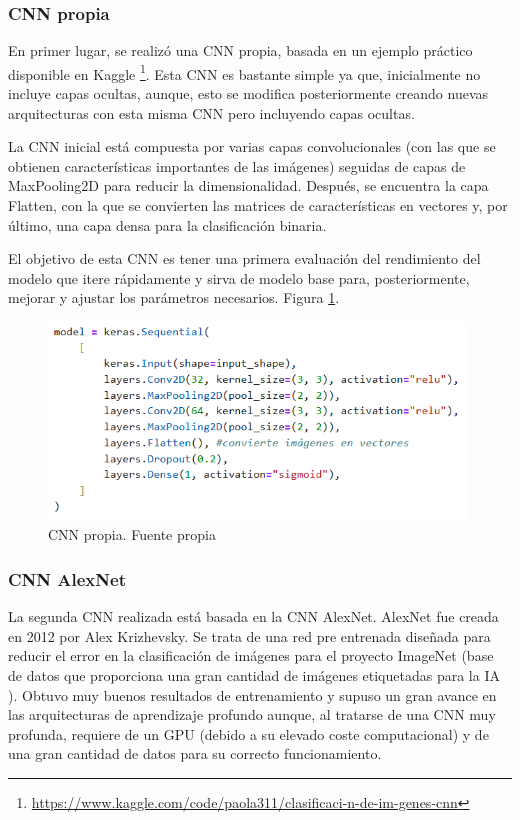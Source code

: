 \subsubsection{CNN propia}

En primer lugar, se realizó una CNN propia, basada en un ejemplo práctico disponible en Kaggle \footnote{\url{https://www.kaggle.com/code/paola311/clasificaci-n-de-im-genes-cnn}}. Esta CNN es bastante simple ya que, inicialmente no incluye capas ocultas, aunque, esto se modifica posteriormente creando nuevas arquitecturas con esta misma CNN pero incluyendo capas ocultas. 

La CNN inicial está compuesta por varias capas convolucionales (con las que se obtienen características importantes de las imágenes) seguidas de capas de MaxPooling2D para reducir la dimensionalidad. Después, se encuentra la capa Flatten, con la que se convierten las matrices de características en vectores y, por último, una capa densa para la clasificación binaria.

El objetivo de esta CNN es tener una primera evaluación del rendimiento del modelo que itere rápidamente y sirva de modelo base para, posteriormente, mejorar y ajustar los parámetros necesarios. Figura \ref{fig:cnn_propia}.

\begin{figure}[h]
    \centering
    \includegraphics[width=0.99\textwidth]{img/cnn_propia.PNG}
    \caption{CNN propia. Fuente propia}
    \label{fig:cnn_propia}
\end{figure}


\subsubsection{CNN AlexNet}

La segunda CNN realizada está basada en la CNN AlexNet. AlexNet fue creada en 2012 por Alex Krizhevsky. Se trata de una red pre entrenada diseñada para reducir el error en la clasificación de imágenes para el proyecto ImageNet \cite{codificandobits24} (base de datos que proporciona una gran cantidad de imágenes etiquetadas para la IA \cite{datasmarts24}). Obtuvo muy buenos resultados de entrenamiento y supuso un gran avance en las arquitecturas de aprendizaje profundo \cite{diego23} aunque, al tratarse de una CNN muy profunda, requiere de un GPU (debido a su elevado coste computacional) y de una gran cantidad de datos para su correcto funcionamiento. 

